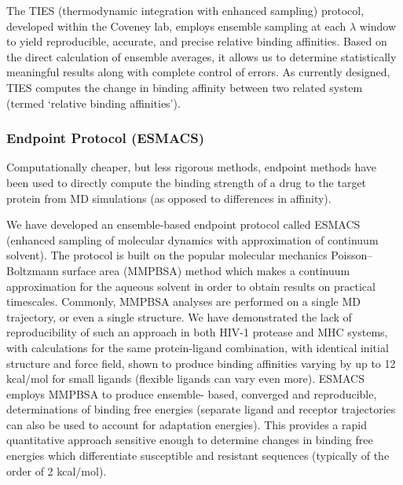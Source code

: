 \documentclass[conference]{IEEEtran}
\begin{document}
The TIES (thermodynamic integration with enhanced sampling) protocol, developed within the Coveney lab, employs ensemble sampling at each $\lambda$ window to yield reproducible, accurate, and precise relative binding affinities. 
\cite{ Wan2017brd4} Based on the direct calculation of ensemble averages, it allows us to determine statistically meaningful results along with complete control of errors. 
As currently designed, TIES computes the change in binding affinity between two related system (termed ‘relative binding affinities’).


\subsubsection{Endpoint Protocol (ESMACS)}\label{sec:esmacs}

Computationally cheaper, but less rigorous methods, endpoint methods have been used to directly compute the binding strength of a drug to the target protein from MD simulations (as opposed to differences in affinity). 

We have developed an ensemble-based endpoint protocol called ESMACS (enhanced sampling of molecular dynamics with approximation of continuum solvent). The protocol is built on the popular molecular mechanics Poisson–Boltzmann surface area (MMPBSA) \cite{Massova1999} method which makes a continuum approximation for the aqueous solvent in order to obtain results on practical timescales. Commonly, MMPBSA analyses are performed on a single MD trajectory, or even a single structure. We have demonstrated the lack of reproducibility of such an approach in both HIV-1 protease and MHC systems, with calculations for the same protein-ligand combination, with identical initial structure and force field, shown to produce binding affinities varying by up to 12 kcal/mol for small ligands (flexible ligands can vary even more). \cite{Wan2015} ESMACS employs MMPBSA to produce ensemble- based, converged and reproducible, determinations of binding free energies (separate ligand and receptor trajectories can also be used to account for adaptation energies). This provides a rapid quantitative approach sensitive enough to determine changes in binding free energies which differentiate susceptible and resistant sequences (typically of the order of 2 kcal/mol).



\end{document}
